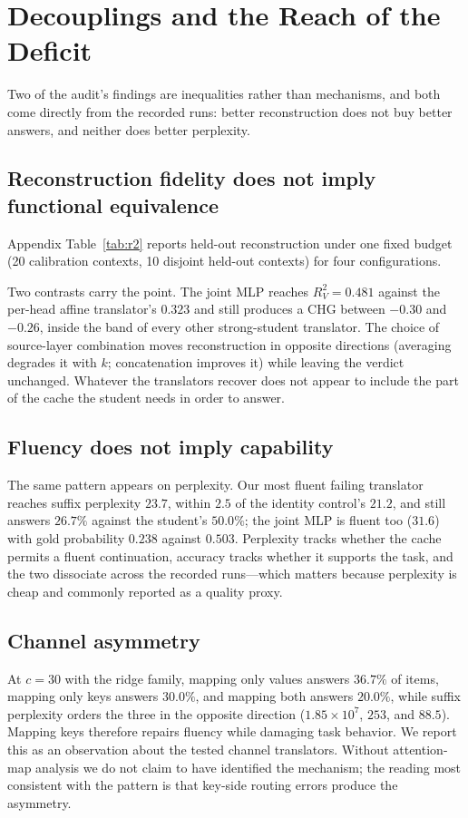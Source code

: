 \documentclass{article} %
\begin{document}
\section{Decouplings and the Reach of the Deficit}
\label{sec:analysis}

Two of the audit's findings are inequalities rather than mechanisms, and both
come directly from the recorded runs: better reconstruction does not buy better
answers, and neither does better perplexity.

\subsection{Reconstruction fidelity does not imply functional equivalence}
Appendix Table~\ref{tab:r2} reports held-out reconstruction under one fixed
budget (20 calibration contexts, 10 disjoint held-out contexts) for four
configurations.

Two contrasts carry the point. The joint MLP reaches $R^2_V = 0.481$ against the
per-head affine translator's $0.323$ and still produces a CHG between $-0.30$ and $-0.26$,
inside the band of every other strong-student translator. The choice of
source-layer combination moves reconstruction in opposite directions (averaging
degrades it with $k$; concatenation improves it) while leaving the verdict
unchanged. Whatever the translators recover does not appear to include the part
of the cache the student needs in order to answer.

\subsection{Fluency does not imply capability}
The same pattern appears on perplexity. Our most fluent failing translator
reaches suffix perplexity $23.7$, within $2.5$ of the identity control's $21.2$,
and still answers $26.7\%$ against the student's $50.0\%$; the joint MLP is
fluent too ($31.6$) with gold probability $0.238$ against $0.503$. Perplexity
tracks whether the cache permits a fluent continuation, accuracy tracks whether
it supports the task, and the two dissociate across the recorded runs---which
matters because perplexity is cheap and commonly reported as a quality proxy.

\subsection{Channel asymmetry}
At $c{=}30$ with the ridge family, mapping only values answers $36.7\%$ of
items, mapping only keys answers $30.0\%$, and mapping both answers $20.0\%$,
while suffix perplexity orders the three in the opposite direction
($1.85\times10^{7}$, $253$, and $88.5$). Mapping keys therefore repairs fluency
while damaging task behavior. We report this as an observation about the tested
channel translators. Without attention-map analysis we do not claim to have
identified the mechanism; the reading most consistent with the pattern is that
key-side routing errors produce the asymmetry.
\end{document}
